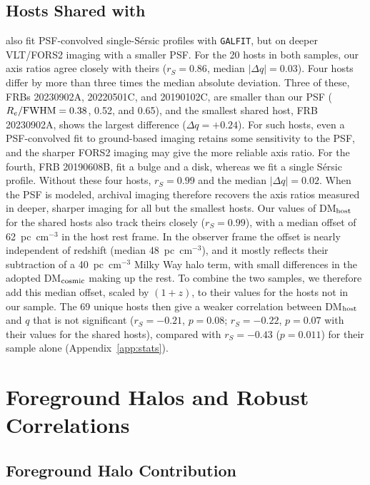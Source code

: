 \documentclass[apjl, linenumbers]{aastex701}
\begin{document}
\subsection{Hosts Shared with \citet{marnoch2026}} \label{app:marnoch}

\citet{marnoch2026} also fit PSF-convolved single-S\'ersic profiles with
\texttt{GALFIT}, but on deeper VLT/FORS2 imaging with a smaller PSF. For the
20 hosts in both samples, our axis ratios agree closely with theirs
($r_S = 0.86$, median $|\Delta q| = 0.03$). Four hosts differ by more than
three times the median absolute deviation. Three of these, FRBs 20230902A,
20220501C, and 20190102C, are smaller than our PSF ($R_e/{\rm FWHM} = 0.38$,
0.52, and 0.65), and the smallest shared host, FRB 20230902A, shows the
largest difference ($\Delta q = +0.24$). For such hosts, even a PSF-convolved
fit to ground-based imaging retains some sensitivity to the PSF, and the
sharper FORS2 imaging may give the more reliable axis ratio. For the fourth,
FRB 20190608B, \citet{marnoch2026} fit a bulge and a disk, whereas we fit a
single S\'ersic profile. Without these four hosts, $r_S = 0.99$ and the median
$|\Delta q| = 0.02$. When the PSF is modeled, archival imaging therefore
recovers the axis ratios measured in deeper, sharper imaging for all but the
smallest hosts. Our values of DM$_{\rm host}$ for the shared hosts also track
theirs closely ($r_S = 0.99$), with a median offset of 62~pc~cm$^{-3}$ in the
host rest frame. In the observer frame the offset is nearly independent of
redshift (median 48~pc~cm$^{-3}$), and it mostly reflects their subtraction
of a 40~pc~cm$^{-3}$ Milky Way halo term, with small differences in the
adopted DM$_{\rm cosmic}$ making up the rest. To combine the two samples, we
therefore add this median offset, scaled by $(1+z)$, to their values for the
hosts not in our sample. The 69 unique hosts then give a weaker correlation
between DM$_{\rm host}$ and $q$ that is not significant ($r_S = -0.21$,
$p = 0.08$; $r_S = -0.22$, $p = 0.07$ with their values for the shared
hosts), compared with $r_S = -0.43$ ($p = 0.011$) for their sample alone
(Appendix~\ref{app:stats}).

\section{Foreground Halos and Robust Correlations} \label{app:halo}

\subsection{Foreground Halo Contribution} \label{app:fg}
\end{document}

